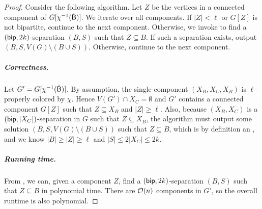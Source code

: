 \lemFindColoredOCC*
\begin{proof}
    Consider the following algorithm.
    Let $Z$ be the vertices in a connected component of $G[\chi^{-1}(\mathsf{\dot{B}})]$.
    We iterate over all components.
    If $|Z|<\ell$ or $G[Z]$ is not bipartite, continue to the next component.
    Otherwise, we invoke  to find a $(\textnormal{\textsf{bip}}, 2k)$-separation $(B,S)$ such that $Z \subseteq B$.
    If such a separation exists, output $(B, S, V(G) \setminus (B \cup S))$.
    Otherwise, continue to the next component.
  
  \subparagraph*{Correctness.}
  Let $G' = G[\chi^{-1}(\mathsf{\dot{B}})]$.
  By assumption, the single-component \occ $(X_B, X_C, X_R)$ is $\ell$-properly colored by $\chi$. Hence $V(G') \cap X_C = \emptyset$ and $G'$ contains a connected component
  $G[Z]$ such that $Z \subseteq X_B$ and $|Z| \geq \ell$.
  Also, because $(X_B, X_C)$ is a $(\textnormal{\textsf{bip}}, |X_C|)$-separation in $G$ such that $Z \subseteq X_B$,
  the algorithm must output some solution $(B,S,V(G)\setminus (B \cup S))$ such that $Z \subseteq B$,
  which is by definition an \occ,
  and we know $|B| \geq |Z| \geq \ell$ and $|S| \leq 2|X_C| \leq 2k$.
  
  \subparagraph*{Running time.}
  From , we can,
  given a component $Z$, find a $(\textnormal{\textsf{bip}},2k)$-separation $(B,S)$
  such that $Z \subseteq B$ in polynomial time.
  There are $\mathcal{O}(n)$ components in $G'$, so the overall runtime is also polynomial.
  \end{proof}
